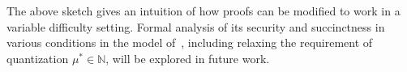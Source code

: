 The above sketch gives an intuition of how proofs can be modified to work in a
variable difficulty setting. Formal analysis of its security and succinctness in
various conditions in the model of~\cite{backbone2}, including relaxing the
requirement of quantization $\mu^* \in \mathbb{N}$, will be explored in future
work.
